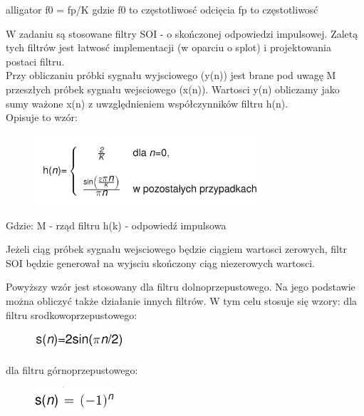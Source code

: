 \documentclass[12pt]{article}
\begin{document}
\begin{labeling}{alligator}
\subsubitem f0 = fp/K gdzie f0 to częstotliwosć odcięcia
\subsubitem fp to częstotliwosć 

W zadaniu są stosowane filtry SOI - o skończonej odpowiedzi impulsowej. Zaletą tych filtrów jest łatwosć implementacji (w oparciu o splot) i projektowania postaci filtru. 
\\Przy obliczaniu próbki sygnału wyjsciowego (y(n)) jest brane pod uwagę M przeszłych próbek sygnału wejsciowego (x(n)). Wartosci y(n) obliczamy jako sumy ważone x(n) z uwzględnieniem współczynników filtru h(n). 
\\Opisuje to wzór:

\begin{figure}[h!]
 \centering
 \includegraphics[width=8.3cm]{filtrS.PNG}
 \vspace{-0.3cm}
 \label{filtrS}
\end{figure}

Gdzie:
\subitem M - rząd filtru 
\subitem h(k) - odpowiedź impulsowa

Jeżeli ciąg próbek sygnału wejsciowego będzie ciągiem wartosci zerowych,  filtr SOI będzie generował na wyjsciu skończony ciąg niezerowych wartosci.

Powyższy wzór jest stosowany dla filtru dolnoprzepustowego. Na jego podstawie można obliczyć także działanie innych filtrów. W tym celu stosuje się wzory:
\subsubitem dla filtru srodkowoprzepustowego:
\begin{figure}[h!]
 \centering
 \includegraphics[width=3.3cm]{sr.PNG}
 \vspace{-0.3cm}
 \label{sp}
\end{figure}



\subsubitem dla filtru górnoprzepustowego:
\begin{figure}[h!]
 \centering
 \includegraphics[width=3cm]{gor.PNG}
 \vspace{-0.3cm}
 \label{gp}
\end{figure}



\end{labeling}
\end{document}
